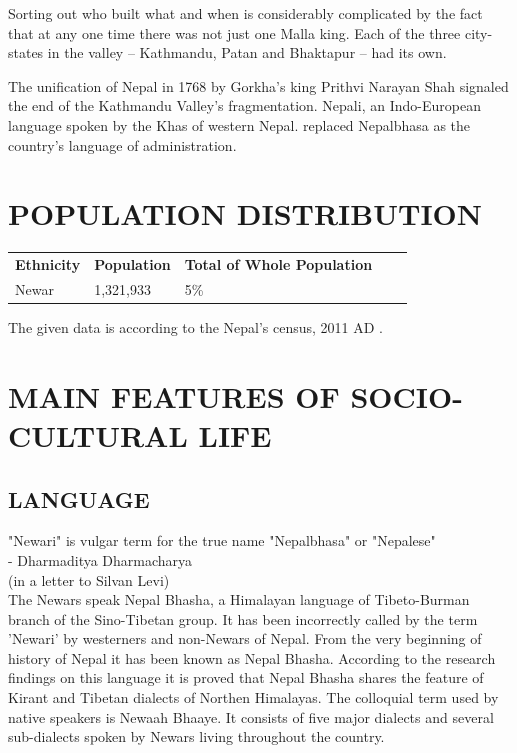 \documentclass[a4paper,13pt, margin=0.9in]{article}
\begin{document}
\begin{flushleft}
	Sorting out who built what and when is considerably complicated by the fact that at any one time there was not just one Malla king. Each of the three city-states in the valley – Kathmandu, Patan and Bhaktapur – had its own.
	\vskip0.5cm

	The unification of Nepal in 1768 by Gorkha's king Prithvi Narayan Shah signaled the end of the Kathmandu Valley's fragmentation. Nepali, an Indo-European language spoken by the Khas of western Nepal. replaced Nepalbhasa as the country's language of administration.

	\newpage
	\section{POPULATION DISTRIBUTION}

	\begin{table}[htb]
		\centering
		\begin{tabular}{lllll}
			\cline{1-3}

			\multicolumn{1}{|l|}{\textbf{Ethnicity}} & \multicolumn{1}{l|}{\textbf{Population}} & \multicolumn{1}{l|}{\textbf{Total of Whole Population}} &  & \\ \cline{1-3}
			\multicolumn{1}{|l|}{Newar}              & \multicolumn{1}{l|}{1,321,933}           & \multicolumn{1}{l|}{5\%}                                &  & \\ \cline{1-3}
		\end{tabular}
	\end{table}

	The given data is according to the Nepal's census, 2011 AD .


	\newpage
	\section{MAIN FEATURES OF SOCIO-CULTURAL LIFE}
	\subsection{LANGUAGE}


	"Newari" is vulgar term for the true name "Nepalbhasa" or "Nepalese" \\
	- Dharmaditya Dharmacharya \\
	(in a letter to Silvan Levi) \\

	The Newars speak Nepal Bhasha, a Himalayan language of Tibeto-Burman branch of the Sino-Tibetan group. It has been incorrectly called by the term 'Newari' by westerners and non-Newars of Nepal. From the very beginning of history of Nepal it has been known as Nepal Bhasha. According to the research findings on this language it is proved that Nepal Bhasha shares the feature of Kirant and Tibetan dialects of Northen Himalayas. The colloquial term used by native speakers is Newaah Bhaaye. It consists of five major dialects and several sub-dialects spoken by Newars living throughout the country. \\


\end{flushleft}
\end{document}
